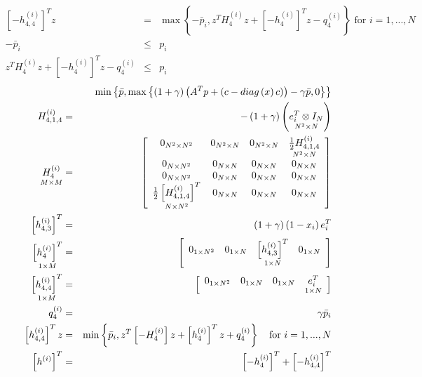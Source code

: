 \documentclass{article}
\begin{document}
\begin{eqnarray*}
\left[ -h_{4,4}^{\left( i\right) }\right] ^{T}z &=&\max \left\{ -\bar{p}%
_{i},z^{T}H_{4}^{\left( i\right) }z+\left[ -h_{4}^{\left( i\right) }\right]
^{T}z-q_{4}^{\left( i\right) }\right\} \text{ for }i=1,...,N \\
-\bar{p}_{i} &\leq &p_{i} \\
z^{T}H_{4}^{\left( i\right) }z+\left[ -h_{4}^{\left( i\right) }\right]
^{T}z-q_{4}^{\left( i\right) } &\leq &p_{i}
\end{eqnarray*}%
\begin{eqnarray*}
&&\min \left\{ \bar{p},\max \left\{ \left( 1+\gamma \right) \left(
A^{T}p+\left( c-diag\left( x\right) c\right) \right) -\gamma \bar{p}%
,0\right\} \right\}  \\
H_{4,1,4}^{\left( i\right) } &=&-\left( 1+\gamma \right) \left( \underset{%
N^{2}\times N}{e_{i}^{T}\otimes I_{N}}\right)  \\
\underset{M\times M}{H_{4}^{\left( i\right) }} &=&\left[ 
\begin{array}{cccc}
0_{N^{2}\times N^{2}} & 0_{N^{2}\times N} & 0_{N^{2}\times N} & \underset{%
N^{2}\times N}{\frac{1}{2}H_{4,1,4}^{\left( i\right) }} \\ 
0_{N\times N^{2}} & 0_{N\times N} & 0_{N\times N} & 0_{N\times N} \\ 
0_{N\times N^{2}} & 0_{N\times N} & 0_{N\times N} & 0_{N\times N} \\ 
\underset{N\times N^{2}}{\frac{1}{2}\left[ H_{4,1,4}^{\left( i\right) }%
\right] ^{T}} & 0_{N\times N} & 0_{N\times N} & 0_{N\times N}%
\end{array}%
\right]  \\
\left[ h_{4,3}^{\left( i\right) }\right] ^{T} &=&\left( 1+\gamma \right)
\left( 1-x_{i}\right) e_{i}^{T} \\
\underset{1\times M}{\left[ h_{4}^{\left( i\right) }\right] ^{T}} &=&\left[ 
\begin{array}{cccc}
0_{1\times N^{2}} & 0_{1\times N} & \underset{1\times N}{\left[
h_{4,3}^{\left( i\right) }\right] ^{T}} & 0_{1\times N}%
\end{array}%
\right]  \\
\underset{1\times M}{\left[ h_{4,4}^{\left( i\right) }\right] ^{T}} &=&\left[
\begin{array}{cccc}
0_{1\times N^{2}} & 0_{1\times N} & 0_{1\times N} & \underset{1\times N}{%
e_{i}^{T}}%
\end{array}%
\right]  \\
q_{4}^{\left( i\right) } &=&\gamma \bar{p}_{i} \\
\left[ h_{4,4}^{\left( i\right) }\right] ^{T}z &=&\min \left\{ \bar{p}%
_{i},z^{T}\left[ -H_{4}^{\left( i\right) }\right] z+\left[ h_{4}^{\left(
i\right) }\right] ^{T}z+q_{4}^{\left( i\right) }\right\} \text{ for }%
i=1,...,N \\
\left[ h^{\left( i\right) }\right] ^{T} &=&\left[ -h_{4}^{\left( i\right) }%
\right] ^{T}+\left[ -h_{4,4}^{\left( i\right) }\right] ^{T}
\end{eqnarray*}%
\end{document}
